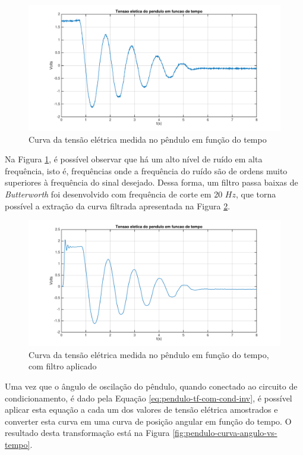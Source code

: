 \documentclass[a4paper]{instrumentacao}
\begin{document}
\begin{figure}[H]
\centering
\includegraphics[width=\textwidth]{time-plot-raw.pdf}
\caption{Curva da tensão elétrica medida no pêndulo em função do tempo}
\label{fig:pendulo-curva-tensao-vs-tempo}
\end{figure}

Na Figura \ref{fig:pendulo-curva-tensao-vs-tempo}, é possível observar que há um alto nível de ruído em alta frequência, isto é, frequências onde a frequência do ruído são de ordens muito superiores à frequência do sinal desejado. Dessa forma, um filtro passa baixas de \textit{Butterworth} foi desenvolvido com frequência de corte em 20 $Hz$, que torna possível a extração da curva filtrada apresentada na Figura \ref{fig:pendulo-curva-tensao-vs-tempo-filtrado}.

\begin{figure}[H]
\centering
\includegraphics[width=\textwidth]{time-plot.pdf}
\caption{Curva da tensão elétrica medida no pêndulo em função do tempo, com filtro aplicado}
\label{fig:pendulo-curva-tensao-vs-tempo-filtrado}
\end{figure}

Uma vez que o ângulo de oscilação do pêndulo, quando conectado ao circuito de condicionamento, é dado pela Equação \ref{eq:pendulo-tf-com-cond-inv}, é possível aplicar esta equação a cada um dos valores de tensão elétrica amostrados e converter esta curva em uma curva de posição angular em função do tempo. O resultado desta transformação está na Figura \ref{fig:pendulo-curva-angulo-vs-tempo}. 
\end{document}
